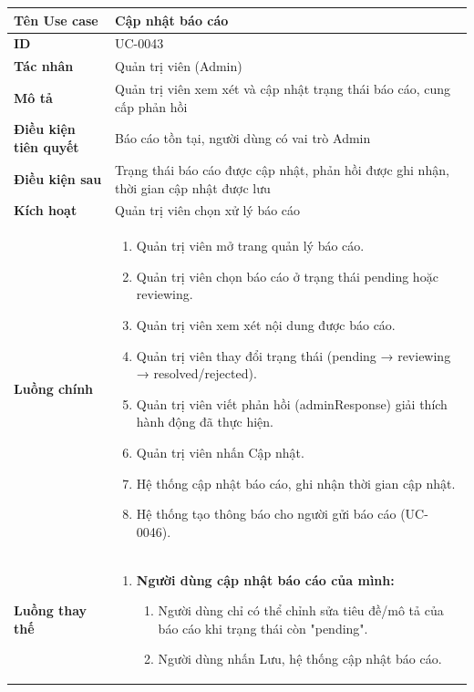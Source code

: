{
\renewcommand{\arraystretch}{1.5}

\begin{tabularx}{\textwidth}{|>{\raggedright\arraybackslash}X|>{\raggedright\arraybackslash}X|}
\hline
\textbf{Tên Use case} & Cập nhật báo cáo \\
\hline
\textbf{ID} & UC-0043 \\
\hline
\textbf{Tác nhân} & Quản trị viên (Admin) \\
\hline
\textbf{Mô tả} & Quản trị viên xem xét và cập nhật trạng thái báo cáo, cung cấp phản hồi \\
\hline
\textbf{Điều kiện tiên quyết} & Báo cáo tồn tại, người dùng có vai trò Admin \\
\hline
\textbf{Điều kiện sau} & Trạng thái báo cáo được cập nhật, phản hồi được ghi nhận, thời gian cập nhật được lưu \\
\hline
\textbf{Kích hoạt} & Quản trị viên chọn xử lý báo cáo \\
\hline
\textbf{Luồng chính} &
\begin{enumerate}
    \item Quản trị viên mở trang quản lý báo cáo.
    \item Quản trị viên chọn báo cáo ở trạng thái pending hoặc reviewing.
    \item Quản trị viên xem xét nội dung được báo cáo.
    \item Quản trị viên thay đổi trạng thái (pending → reviewing → resolved/rejected).
    \item Quản trị viên viết phản hồi (adminResponse) giải thích hành động đã thực hiện.
    \item Quản trị viên nhấn Cập nhật.
    \item Hệ thống cập nhật báo cáo, ghi nhận thời gian cập nhật.
    \item Hệ thống tạo thông báo cho người gửi báo cáo (UC-0046).
\end{enumerate} \\
\hline
\textbf{Luồng thay thế} &
\begin{enumerate}
    \item \textbf{Người dùng cập nhật báo cáo của mình:}
    \begin{enumerate}
        \item[2A.] Người dùng chỉ có thể chỉnh sửa tiêu đề/mô tả của báo cáo khi trạng thái còn "pending".
        \item[3A.] Người dùng nhấn Lưu, hệ thống cập nhật báo cáo.
    \end{enumerate}

\end{enumerate}
\end{tabularx}}
